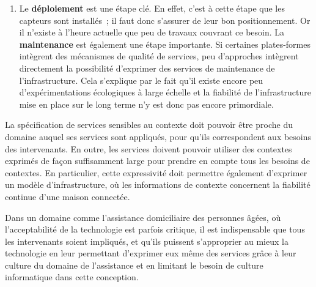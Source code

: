\begin{enumerate}
\item Le {\bf déploiement} est une étape clé. En effet, c'est à cette
  étape que les capteurs sont installés~; il faut donc s'assurer de
  leur bon positionnement. Or il n'existe à l'heure actuelle que peu
  de travaux couvrant ce besoin. La {\bf maintenance} est également
  une étape importante. Si certaines plates-formes intègrent des
  mécanismes de qualité de services, peu d'approches intègrent
  directement la possibilité d'exprimer des services de maintenance de
  l'infrastructure. Cela s'explique par le fait qu'il existe encore
  peu d'expérimentations écologiques à large échelle et la fiabilité
  de l'infrastructure mise en place sur le long terme n'y est donc pas
  encore primordiale.
\end{enumerate}

La spécification de services sensibles au contexte doit pouvoir être
proche du domaine auquel ses services sont appliqués, pour qu'ils
correspondent aux besoins des intervenants.  En outre, les services
doivent pouvoir utiliser des contextes exprimés de façon suffisamment
large pour prendre en compte tous les besoins de contextes. En
particulier, cette expressivité doit permettre également d'exprimer
un modèle d'infrastructure, où les informations de contexte concernent
la fiabilité continue d'une maison connectée.

Dans un domaine comme l'assistance domiciliaire des personnes âgées,
où l'acceptabilité de la technologie est parfois critique, il est
indispensable que tous les intervenants soient impliqués, et qu'ils
puissent s'approprier au mieux la technologie en leur permettant
d'exprimer eux même des services grâce à leur culture du domaine de
l'assistance et en limitant le besoin de culture informatique dans
cette conception.










